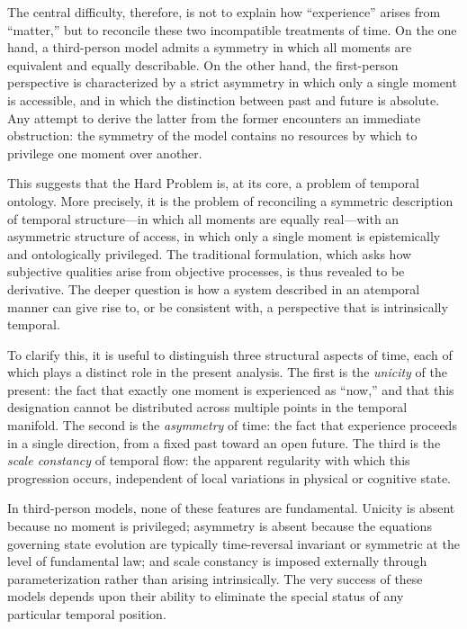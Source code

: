\documentclass[11pt,a4paper]{article}
\theoremstyle{definition}
\theoremstyle{remark}
\begin{document}
The central difficulty, therefore, is not to explain how ``experience'' arises from ``matter,'' but to reconcile these two incompatible treatments of time. On the one hand, a third-person model admits a symmetry in which all moments are equivalent and equally describable. On the other hand, the first-person perspective is characterized by a strict asymmetry in which only a single moment is accessible, and in which the distinction between past and future is absolute. Any attempt to derive the latter from the former encounters an immediate obstruction: the symmetry of the model contains no resources by which to privilege one moment over another.

This suggests that the Hard Problem is, at its core, a problem of temporal ontology. More precisely, it is the problem of reconciling a symmetric description of temporal structure---in which all moments are equally real---with an asymmetric structure of access, in which only a single moment is epistemically and ontologically privileged. The traditional formulation, which asks how subjective qualities arise from objective processes, is thus revealed to be derivative. The deeper question is how a system described in an atemporal manner can give rise to, or be consistent with, a perspective that is intrinsically temporal.

To clarify this, it is useful to distinguish three structural aspects of time, each of which plays a distinct role in the present analysis. The first is the \emph{unicity} of the present: the fact that exactly one moment is experienced as ``now,'' and that this designation cannot be distributed across multiple points in the temporal manifold. The second is the \emph{asymmetry} of time: the fact that experience proceeds in a single direction, from a fixed past toward an open future. The third is the \emph{scale constancy} of temporal flow: the apparent regularity with which this progression occurs, independent of local variations in physical or cognitive state.

In third-person models, none of these features are fundamental. Unicity is absent because no moment is privileged; asymmetry is absent because the equations governing state evolution are typically time-reversal invariant or symmetric at the level of fundamental law; and scale constancy is imposed externally through parameterization rather than arising intrinsically. The very success of these models depends upon their ability to eliminate the special status of any particular temporal position.
\end{document}
